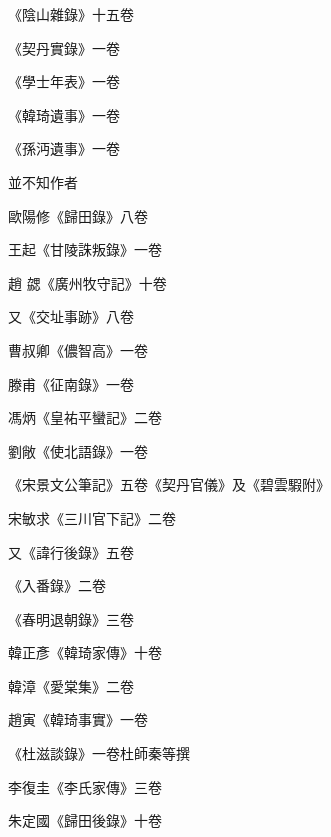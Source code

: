 \begin{pinyinscope}
 《陰山雜錄》十五卷



 《契丹實錄》一卷



 《學士年表》一卷



 《韓琦遺事》一卷



 《孫沔遺事》一卷



 並不知作者



 歐陽修《歸田錄》八卷



 王起《甘陵誅叛錄》一卷



 趙
 勰《廣州牧守記》十卷



 又《交址事跡》八卷



 曹叔卿《儂智高》一卷



 滕甫《征南錄》一卷



 馮炳《皇祐平蠻記》二卷



 劉敞《使北語錄》一卷



 《宋景文公筆記》五卷《契丹官儀》及《碧雲騢附》



 宋敏求《三川官下記》二卷



 又《諱行後錄》五卷



 《入番錄》二卷



 《春明退朝錄》三卷



 韓正彥《韓琦家傳》十卷



 韓漳《愛棠集》二卷



 趙寅《韓琦事實》一卷



 《杜滋談錄》一卷杜師秦等撰



 李復圭《李氏家傳》三卷



 朱定國《歸田後錄》十卷




\end{pinyinscope}
